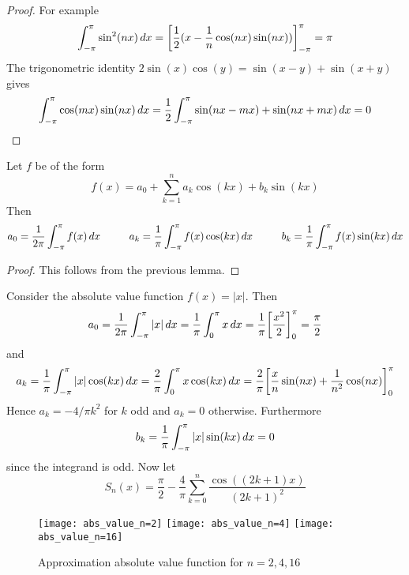 \begin{proof}
	For example
	\[
		\int_{-\pi}^\pi \sin^2(nx)\,dx = {\left[\frac{1}{2}(x - \frac{1}{n}\cos(nx)\sin(nx))\right]}_{-\pi}^\pi = \pi
	\]
	The trigonometric identity \( 2\sin(x)\cos(y) = \sin(x - y) + \sin(x + y) \) gives
	\[
		\int_{-\pi}^\pi \cos(mx)\sin(nx)\,dx = \frac{1}{2} \int_{-\pi}^\pi \sin(nx - mx) + \sin(nx + mx)\,dx = 0
	\]
\end{proof}
\bigskip


\begin{lemma}
	Let \( f \) be of the form
	\[
		f(x) = a_0 + \sum_{k = 1}^n a_k \cos(kx) + b_k \sin(kx)
	\]
	Then
	\[
		a_0 = \frac{1}{2\pi} \int_{-\pi}^\pi f(x)\,dx \mspace{50mu}
		a_k = \frac{1}{\pi} \int_{-\pi}^\pi f(x)\cos(kx)\,dx \mspace{50mu}
		b_k = \frac{1}{\pi} \int_{-\pi}^\pi f(x)\sin(kx)\,dx
	\]
\end{lemma}

\begin{proof}
	This follows from the previous lemma.
\end{proof}
\bigskip


\begin{example}
	Consider the absolute value function \( f(x) = |x| \). Then
	\[
		a_0 = \frac{1}{2\pi} \int_{-\pi}^\pi |x|\,dx = \frac{1}{\pi} \int_0^\pi x\,dx
		= \frac{1}{\pi} {\left[ \frac{x^2}{2} \right]}_{0}^\pi = \frac{\pi}{2}
	\]
	and
	\[
		a_k = \frac{1}{\pi} \int_{-\pi}^\pi |x|\cos(kx)\,dx = \frac{2}{\pi} \int_0^\pi x\cos(kx)\,dx
		= \frac{2}{\pi} {\left[ \frac{x}{n} \sin(nx) + \frac{1}{n^2} \cos(nx) \right]}_0^\pi
	\]
	Hence \( a_k = -4/{\pi k^2} \) for \( k \) odd and \( a_k = 0 \) otherwise. Furthermore
	\[
		b_k = \frac{1}{\pi} \int_{-\pi}^\pi |x|\sin(kx)\,dx = 0
	\]
	since the integrand is odd. Now let
	\[
		S_n(x) = \frac{\pi}{2} - \frac{4}{\pi} \sum_{k=0}^n \frac{\cos((2k + 1)x)}{{(2k + 1)}^2}
	\]
	\begin{figure}[h!]
		\centering
		\texttt{[image: abs\_value\_n=2]}
		\texttt{[image: abs\_value\_n=4]}
		\texttt{[image: abs\_value\_n=16]}
		\caption{Approximation absolute value function for \( n = 2, 4, 16 \)}
	\end{figure}
\end{example}
\bigskip


